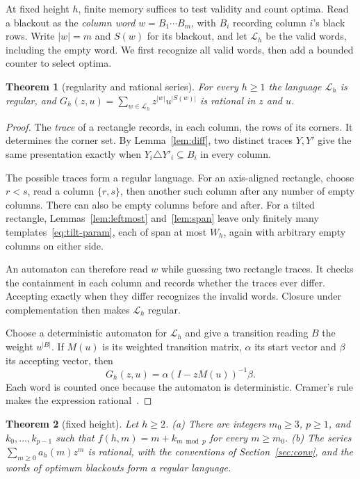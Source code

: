 \documentclass[12pt]{article}
\theoremstyle{plain}
\newtheorem{theorem}{Theorem}
\theoremstyle{definition}
\theoremstyle{remark}
\begin{document}
At fixed height $h$, finite memory suffices to test validity and count optima.
Read a blackout as the \emph{column word} $w=B_1\cdots B_m$, with $B_i$
recording column $i$'s black rows. Write $|w|=m$ and $S(w)$ for its blackout,
and let $\mathcal L_h$ be the valid words, including the empty word.
We first recognize all valid words, then add a bounded counter to select optima.

\begin{theorem}[regularity and rational series]\label{thm:regular}
For every $h\ge1$ the language $\mathcal L_h$ is regular, and $G_h(z,u)=\sum_{w\in\mathcal L_h}z^{|w|}u^{|S(w)|}$ is rational in $z$ and $u$.
\end{theorem}

\begin{proof}
The \emph{trace} of a rectangle records, in each column, the rows of its
corners. It determines the corner set. By Lemma~\ref{lem:diff}, two distinct
traces $Y,Y'$ give the same presentation exactly when
$Y_i\triangle Y'_i\subseteq B_i$ in every column.

The possible traces form a regular language. For an axis-aligned rectangle,
choose $r<s$, read a column $\{r,s\}$, then another such column after any
number of empty columns. There can also be empty columns before and after.
For a tilted rectangle, Lemmas~\ref{lem:leftmost} and~\ref{lem:span} leave
only finitely many templates~\eqref{eq:tilt-param}, each of span at most
$W_h$, again with arbitrary empty columns on either side.

An automaton can therefore read $w$ while guessing two rectangle traces.
It checks the containment in each column and records whether the traces ever
differ. Accepting exactly when they differ recognizes the invalid words.
Closure under complementation then makes $\mathcal L_h$ regular.

Choose a deterministic automaton for $\mathcal L_h$ and give a transition
reading $B$ the weight $u^{|B|}$. If $M(u)$ is its weighted transition
matrix, $\alpha$ its start vector and $\beta$ its accepting vector, then
\[
 G_h(z,u)=\alpha(I-zM(u))^{-1}\beta .
\]
Each word is counted once because the automaton is deterministic. Cramer's
rule makes the expression rational~\cite[Proposition~V.6]{flajolet2009}.
\end{proof}

\begin{theorem}[fixed height]\label{thm:periodic}
Let $h\ge2$. (a) There are integers $m_0\ge3$, $p\ge1$, and $k_0,\dots,k_{p-1}$ such that $f(h,m)=m+k_{m\bmod p}$ for every $m\ge m_0$. (b) The series $\sum_{m\ge0}a_h(m)z^m$ is rational, with the conventions of Section~\ref{sec:conv}, and the words of optimum blackouts form a regular language.
\end{theorem}
\end{document}
